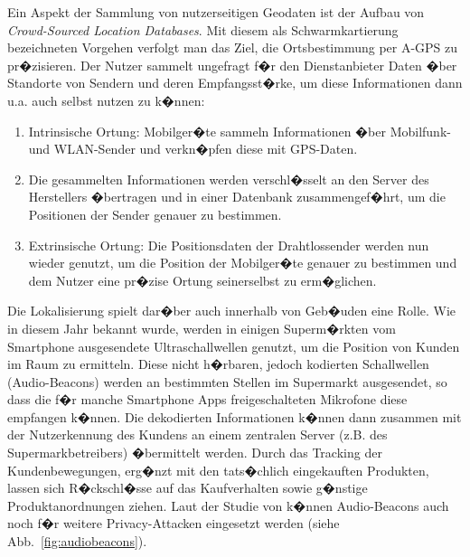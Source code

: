Ein Aspekt der Sammlung von nutzerseitigen Geodaten ist der Aufbau von \textit{Crowd-Sourced Location Databases}. Mit diesem als Schwarmkartierung bezeichneten Vorgehen verfolgt man das Ziel, die Ortsbestimmung per A-GPS zu pr�zisieren. Der Nutzer sammelt ungefragt f�r den Dienstanbieter Daten �ber Standorte von Sendern und deren Empfangsst�rke, um diese Informationen dann u.a. auch selbst nutzen zu k�nnen: 
\newpage
\begin{enumerate}
	\item Intrinsische Ortung: Mobilger�te sammeln Informationen �ber Mobilfunk- und WLAN-Sender und verkn�pfen diese mit GPS-Daten.
	\item Die gesammelten Informationen werden verschl�sselt an den Server des Herstellers �bertragen und in einer Datenbank zusammengef�hrt, um die Positionen der Sender genauer zu bestimmen. 
	\item Extrinsische Ortung: Die Positionsdaten der Drahtlossender werden nun wieder genutzt, um die Position der Mobilger�te genauer zu bestimmen und dem Nutzer eine pr�zise Ortung seinerselbst zu erm�glichen. 
\end{enumerate}

Die Lokalisierung spielt dar�ber auch innerhalb von Geb�uden eine Rolle. Wie in diesem Jahr bekannt wurde, werden in einigen Superm�rkten vom Smartphone ausgesendete Ultraschallwellen genutzt, um die Position von Kunden im Raum zu ermitteln. Diese nicht h�rbaren, jedoch kodierten Schallwellen (Audio-Beacons) werden an bestimmten Stellen im Supermarkt ausgesendet, so dass die f�r manche Smartphone Apps freigeschalteten Mikrofone diese empfangen k�nnen. Die dekodierten Informationen k�nnen dann zusammen mit der Nutzerkennung des Kundens an einem zentralen Server (z.B. des Supermarkbetreibers) �bermittelt werden. Durch das Tracking der Kundenbewegungen, erg�nzt mit den tats�chlich eingekauften Produkten, lassen sich R�ckschl�sse auf das Kaufverhalten sowie g�nstige Produktanordnungen ziehen. Laut der Studie von \citet{Quiring2017} k�nnen Audio-Beacons auch noch f�r weitere Privacy-Attacken eingesetzt werden (siehe Abb.~\ref{fig:audiobeacons}). 


